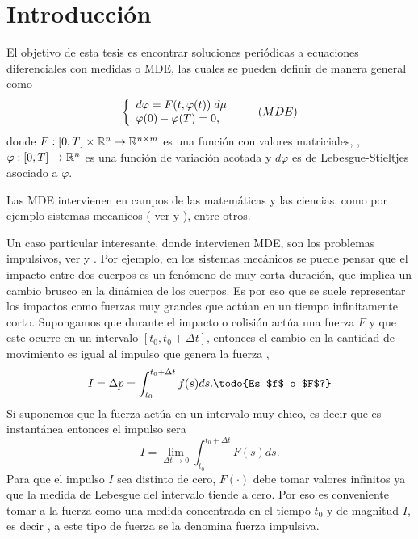 

\chapter{Introducción}
El objetivo de esta tesis es encontrar soluciones periódicas a ecuaciones diferenciales con medidas o MDE, las cuales se pueden definir de manera general como 
	\begin{equation*}
	\left\lbrace \begin{array}{l} \label{eq:problema A}
		d\varphi=F(t,\varphi(t))\;d \mu\\
		\varphi(0)-\varphi(T)=0,
	\end{array}\right. \tag{${MDE}$}
\end{equation*}
donde $F:[0,T]\times\mathbb{R}^n\to\mathbb{R}^{n\times m}$ es una función con valores matriciales, , $\varphi:[0,T]\to \mathbb{R}^n$ es una función de variación acotada  y $d\varphi$ es  de Lebesgue-Stieltjes asociado a $\varphi$.

Las MDE intervienen en campos de las matemáticas y las ciencias, como por ejemplo sistemas mecanicos ( ver \cite{Brogliato} y \cite{ALeonov}), entre otros.


Un caso particular interesante, donde intervienen MDE, son los problemas impulsivos, ver \cite{Bainov} y \cite{Lakshmikan}. Por ejemplo, en los sistemas mecánicos se puede pensar que el impacto entre dos cuerpos es un fenómeno de muy corta duración, que implica un cambio brusco en la dinámica de los cuerpos. Es por eso que se suele representar los impactos como fuerzas muy grandes que actúan en un tiempo infinitamente corto. Supongamos que durante el impacto o colisión actúa una fuerza $F$ y que este ocurre en un intervalo $[t_0,t_0+\Delta t]$, entonces el cambio en la cantidad de movimiento es igual al impulso que genera la fuerza  \cite{Serway}, 
$$I=\Delta p=\int_{t_0}^{t_0+\Delta t}f(s)ds.\textrm{\todo{Es $f$ o $F$?}}$$
Si suponemos que la fuerza actúa en un intervalo muy chico, es decir que es instantánea entonces el impulso sera
    \begin{equation*}
        I=\lim_{\Delta t \to 0}\int_{t_0}^{t_0+\Delta t}F(s) ds. 
    \end{equation*}
Para que el impulso $I$ sea distinto de cero, $F(\cdot)$ debe tomar valores infinitos ya que la medida de Lebesgue del intervalo tiende a cero. Por eso es conveniente tomar a la fuerza como una medida concentrada en el tiempo $t_0$ y de magnitud $I$, es decir , a este tipo de fuerza se la  denomina fuerza impulsiva.

